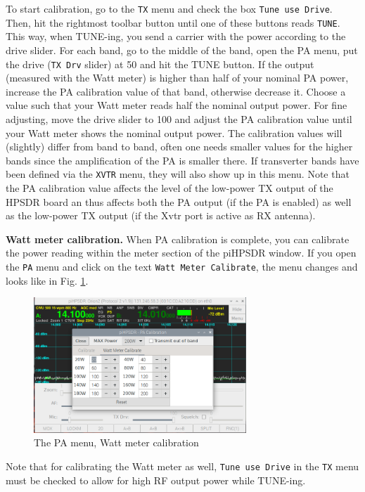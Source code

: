 \documentclass[12pt]{book}
\def\rett#1{\texttt{\color{red}#1}}
\def\bltt#1{\texttt{\color{blue}#1}}
\def\pH{pi\-HPSDR }
\begin{document}
To start calibration, go to the \bltt{TX} menu and check the
box \rett{Tune use Drive}. Then, hit the rightmost toolbar button
until one of these buttons reads \bltt{TUNE}. This way, when
TUNE-ing, you send a carrier with the power according to the drive
slider. For each band, go to the middle of the band, open the PA
menu, put the drive (\rett{TX Drv} slider) at 50 and hit the TUNE button. If the
output (measured with the Watt meter) is higher than half
 of your nominal PA power, increase the
PA calibration value of that band, otherwise decrease it. Choose
a value such that your Watt meter reads half the nominal output
power. For fine adjusting, move the drive slider to 100 and
adjust the PA calibration value until your Watt meter shows the
nominal output  power. The calibration values will  (slightly)
differ from band to band, often one needs smaller values for the
higher bands since the amplification of the PA is smaller there.
If transverter bands have been defined via the \bltt{XVTR} menu,
they will also show up in this menu. Note that the PA calibration
value affects the level of the low-power TX output of the HPSDR board
an thus affects both the PA output (if the PA is enabled) as well
as the low-power TX output (if the Xvtr port is active as RX antenna).

\textbf{Watt meter calibration.} When PA calibration is complete,
you can calibrate the power reading within the meter section of
the \pH window. If you open the \bltt{PA} menu and click
on the text \rett{Watt Meter Calibrate}, the menu changes
and looks like in Fig. \ref{fig:PAMenuWatt}.

\begin{figure}[ht]
\center
\includegraphics[width=8cm]{PAmenuWatt.png}
\caption{The PA menu, Watt meter calibration}
\label{fig:PAMenuWatt}
\end{figure}
Note that for calibrating the Watt meter as well,
 \rett{Tune use Drive} in the \bltt{TX} menu must be checked
 to allow for high RF output
power while TUNE-ing.
\end{document}

